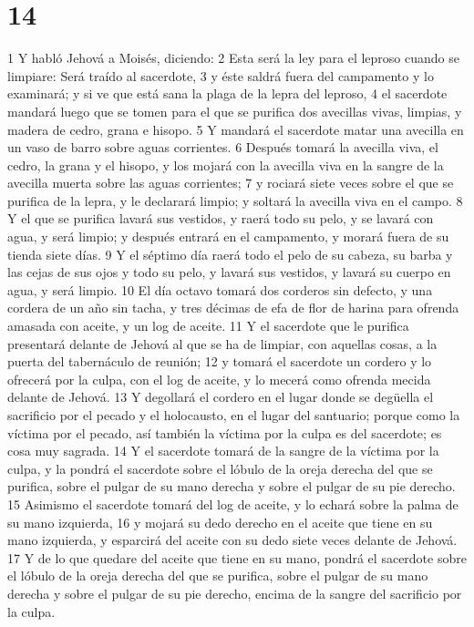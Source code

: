 \chapter{14}


1 Y habló Jehová a Moisés, diciendo:
2 Esta será la ley para el leproso cuando se limpiare: Será traído al sacerdote,
3 y éste saldrá fuera del campamento y lo examinará; y si ve que está sana la plaga de la lepra del leproso,
4 el sacerdote mandará luego que se tomen para el que se purifica dos avecillas vivas, limpias, y madera de cedro, grana e hisopo.
5 Y mandará el sacerdote matar una avecilla en un vaso de barro sobre aguas corrientes.
6 Después tomará la avecilla viva, el cedro, la grana y el hisopo, y los mojará con la avecilla viva en la sangre de la avecilla muerta sobre las aguas corrientes;
7 y rociará siete veces sobre el que se purifica de la lepra, y le declarará limpio; y soltará la avecilla viva en el campo.
8 Y el que se purifica lavará sus vestidos, y raerá todo su pelo, y se lavará con agua, y será limpio; y después entrará en el campamento, y morará fuera de su tienda siete días.
9 Y el séptimo día raerá todo el pelo de su cabeza, su barba y las cejas de sus ojos y todo su pelo, y lavará sus vestidos, y lavará su cuerpo en agua, y será limpio.
10 El día octavo tomará dos corderos sin defecto, y una cordera de un año sin tacha, y tres décimas de efa   de flor de harina para ofrenda amasada con aceite, y un log de aceite.
11 Y el sacerdote que le purifica presentará delante de Jehová al que se ha de limpiar, con aquellas cosas, a la puerta del tabernáculo de reunión;
12 y tomará el sacerdote un cordero y lo ofrecerá por la culpa, con el log   de aceite, y lo mecerá como ofrenda mecida delante de Jehová.
13 Y degollará el cordero en el lugar donde se degüella el sacrificio por el pecado y el holocausto, en el lugar del santuario; porque como la víctima por el pecado, así también la víctima por la culpa es del sacerdote; es cosa muy sagrada.
14 Y el sacerdote tomará de la sangre de la víctima por la culpa, y la pondrá el sacerdote sobre el lóbulo de la oreja derecha del que se purifica, sobre el pulgar de su mano derecha y sobre el pulgar de su pie derecho.
15 Asimismo el sacerdote tomará del log   de aceite, y lo echará sobre la palma de su mano izquierda,
16 y mojará su dedo derecho en el aceite que tiene en su mano izquierda, y esparcirá del aceite con su dedo siete veces delante de Jehová.
17 Y de lo que quedare del aceite que tiene en su mano, pondrá el sacerdote sobre el lóbulo de la oreja derecha del que se purifica, sobre el pulgar de su mano derecha y sobre el pulgar de su pie derecho, encima de la sangre del sacrificio por la culpa.
